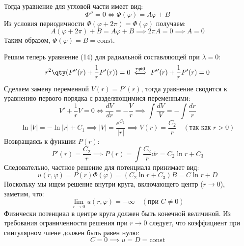 \begin{example}[2 случай: $\lambda = 0$]
	Тогда уравнение для угловой части имеет вид:
	\begin{equation*}
		\Phi'' = 0 \iff \Phi(\varphi) = A\varphi + B
	\end{equation*}
	Из условия периодичности $\Phi(\varphi + 2\pi) = \Phi(\varphi)$ получаем:
	\begin{equation*}
		A(\varphi + 2\pi) + B = A\varphi + B \implies 2\pi A = 0 \implies A = 0
	\end{equation*}
	Таким образом, $\Phi(\varphi) = B = \text{const}$.
	
	Решим теперь уравнение (14) для радиальной составляющей при $\lambda = 0$:
	\begin{equation*}
		r^2\qty(P''(r) + \frac{1}{r}P'(r)) = 0 \overset{r \neq 0}{\iff} P''(r) + \frac{1}{r}P'(r) = 0
	\end{equation*}
	Сделаем замену переменной $V(r) = P'(r)$, тогда уравнение сводится к уравнению первого порядка с разделяющимися переменными:
	\begin{equation*}
		V' + \frac{1}{r}V = 0 \iff \frac{dV}{dr} = -\frac{V}{r} \implies \int \frac{dV}{V} = -\int \frac{dr}{r}
	\end{equation*}
	\begin{equation*}
		\ln|V| = -\ln|r| + C_1 \implies |V| = \frac{e^{C_1}}{|r|} \implies V(r) = \frac{C_2}{r} \quad (\text{так как } r > 0)
	\end{equation*}
	Возвращаясь к функции $P(r)$:
	\begin{equation*}
		P'(r) = \frac{C_2}{r} \implies P(r) = \int \frac{C_2}{r} \dd{r} = C_2 \ln r + C_3
	\end{equation*}
	Следовательно, частное решение для потенциала принимает вид:
	\begin{equation*}
		u(r,\varphi) = P(r)\Phi(\varphi) = (C_2 \ln r + C_3) B = C \ln r + D
	\end{equation*}
	Поскольку мы ищем решение внутри круга, включающего центр ($r \to 0$), заметим, что:
	\begin{equation*}
		\lim_{r\to 0} u(r,\varphi) = -\infty \quad (\text{при } C \neq 0)
	\end{equation*}
	Физически потенциал в центре круга должен быть конечной величиной. Из требования ограниченности решения при $r \to 0$ следует, что коэффициент при сингулярном члене должен быть равен нулю:
	\begin{equation*}
		C = 0 \implies u = D = \text{const}
	\end{equation*}
\end{example}

